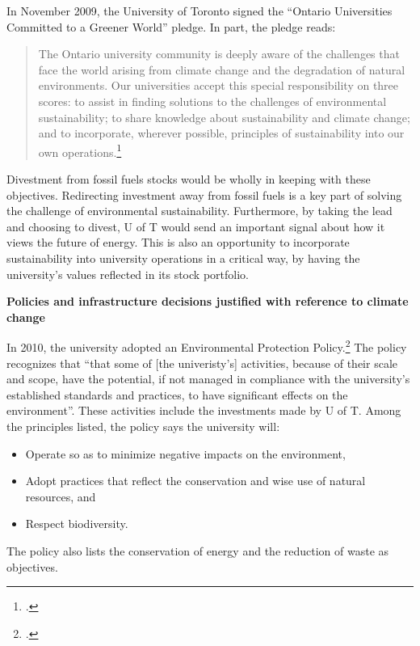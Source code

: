 \documentclass[10pt]{article}
\begin{document}
In November 2009, the University of Toronto signed the ``Ontario Universities Committed to a Greener World'' pledge. In part, the pledge reads:
\begin{quote}
The Ontario university community is deeply aware of the challenges that face the world arising from climate change and the degradation of natural environments. Our universities accept this special responsibility on three scores: to assist in finding solutions to the challenges of environmental sustainability; to share knowledge about sustainability and climate change; and to incorporate, wherever possible, principles of sustainability into our own operations.\footcite[][]{OntarioPledge}
\end{quote}
Divestment from fossil fuels stocks would be wholly in keeping with these objectives.
Redirecting investment away from fossil fuels is a key part of solving the challenge of environmental sustainability.
Furthermore, by taking the lead and choosing to divest, U of T would send an important signal about how it views the future of energy.
This is also an opportunity to incorporate sustainability into university operations in a critical way, by having the university's values reflected in its stock portfolio.



\textbf{Policies and infrastructure decisions justified with reference to climate change}
\label{UofTActions}






In 2010, the university adopted an Environmental Protection Policy.\footcite[][]{UTEnvProtectionPolicy}
The policy recognizes that ``that some of [the univeristy's] activities, because of their scale and scope, have the potential, if not managed in compliance with the university’s established standards and practices, to have significant effects on the environment''.
These activities include the investments made by U of T.
Among the principles listed, the policy says the university will:
\begin{itemize}
	\item Operate so as to minimize negative impacts on the environment,
	\item Adopt practices that reflect the conservation and wise use of natural resources, and
	\item Respect biodiversity.
\end{itemize}
The policy also lists the conservation of energy and the reduction of waste as objectives.
\end{document}
